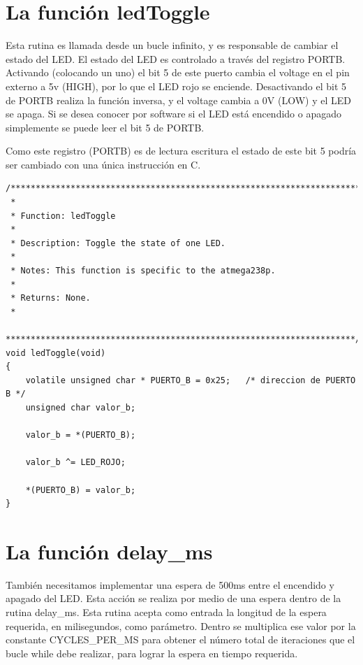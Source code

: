 \documentclass[12pt]{article}
\begin{document}
\section *{La función ledToggle}

Esta rutina es llamada desde un bucle infinito, y es responsable de cambiar
el estado del LED. El estado del LED es controlado a través del registro
PORTB. Activando (colocando un uno) el bit 5 de este puerto cambia el voltage 
en el pin externo a 5v (HIGH), por lo que el LED rojo se enciende.
Desactivando el bit 5 de PORTB realiza la función inversa, y el voltage cambia
a 0V (LOW) y el LED se apaga.
Si se desea conocer por software si el LED está encendido o apagado simplemente
se puede leer el bit 5 de PORTB.

Como este registro (PORTB) es de lectura escritura el estado de este bit
5 podría ser cambiado con una única instrucción en C.

\begin{verbatim}
/**********************************************************************
 *
 * Function: ledToggle
 *
 * Description: Toggle the state of one LED.
 *
 * Notes: This function is specific to the atmega238p.
 *
 * Returns: None.
 *
 **********************************************************************/
void ledToggle(void)
{
    volatile unsigned char * PUERTO_B = 0x25;	/* direccion de PUERTO B */
    unsigned char valor_b;

    valor_b = *(PUERTO_B);

    valor_b ^= LED_ROJO;

    *(PUERTO_B) = valor_b;
}
\end{verbatim}

\section *{La función delay\_ms}

También necesitamos implementar una espera de 500ms entre el encendido y apagado
del LED. Esta acción se realiza por medio de una espera dentro de la rutina
delay\_ms.
Esta rutina acepta como entrada la longitud de la espera requerida, en milisegundos, como parámetro. Dentro se multiplica ese valor por la constante
CYCLES\_PER\_MS para obtener el número total de iteraciones que el bucle
while debe realizar, para lograr la espera en tiempo requerida.
\end{document}
